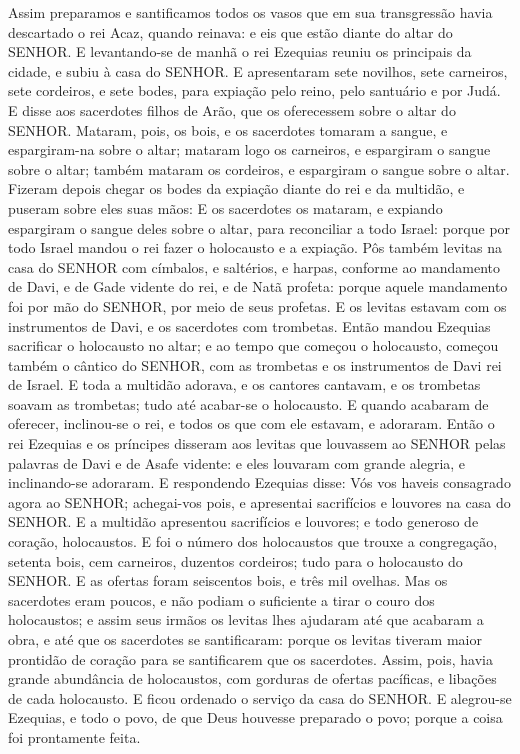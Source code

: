 {Assim preparamos e santificamos todos os vasos que em sua transgressão havia descartado o rei Acaz, quando reinava: e eis que estão diante do altar do SENHOR.
E levantando-se de manhã o rei Ezequias reuniu os principais da cidade, e subiu à casa do SENHOR.
E apresentaram sete novilhos, sete carneiros, sete cordeiros, e sete bodes, para expiação pelo reino, pelo santuário e por Judá. E disse aos sacerdotes filhos de Arão, que os oferecessem sobre o altar do SENHOR.
Mataram, pois, os bois, e os sacerdotes tomaram a sangue, e espargiram-na sobre o altar; mataram logo os carneiros, e espargiram o sangue sobre o altar; também mataram os cordeiros, e espargiram o sangue sobre o altar.
Fizeram depois chegar os bodes da expiação diante do rei e da multidão, e puseram sobre eles suas mãos:
E os sacerdotes os mataram, e expiando espargiram o sangue deles sobre o altar, para reconciliar a todo Israel: porque por todo Israel mandou o rei fazer o holocausto e a expiação.
Pôs também levitas na casa do SENHOR com címbalos, e saltérios, e harpas, conforme ao mandamento de Davi, e de Gade vidente do rei, e de Natã profeta: porque aquele mandamento foi por mão do SENHOR, por meio de seus profetas.
E os levitas estavam com os instrumentos de Davi, e os sacerdotes com trombetas.
Então mandou Ezequias sacrificar o holocausto no altar; e ao tempo que começou o holocausto, começou também o cântico do SENHOR, com as trombetas e os instrumentos de Davi rei de Israel.
E toda a multidão adorava, e os cantores cantavam, e os trombetas soavam as trombetas; tudo até acabar-se o holocausto.
E quando acabaram de oferecer, inclinou-se o rei, e todos os que com ele estavam, e adoraram.
Então o rei Ezequias e os príncipes disseram aos levitas que louvassem ao SENHOR pelas palavras de Davi e de Asafe vidente: e eles louvaram com grande alegria, e inclinando-se adoraram.
E respondendo Ezequias disse: Vós vos haveis consagrado agora ao SENHOR; achegai-vos pois, e apresentai sacrifícios e louvores na casa do SENHOR. E a multidão apresentou sacrifícios e louvores; e todo generoso de coração, holocaustos.
E foi o número dos holocaustos que trouxe a congregação, setenta bois, cem carneiros, duzentos cordeiros; tudo para o holocausto do SENHOR.
E as ofertas foram seiscentos bois, e três mil ovelhas.
Mas os sacerdotes eram poucos, e não podiam o suficiente a tirar o couro dos holocaustos; e assim seus irmãos os levitas lhes ajudaram até que acabaram a obra, e até que os sacerdotes se santificaram: porque os levitas tiveram maior prontidão de coração para se santificarem que os sacerdotes.
Assim, pois, havia grande abundância de holocaustos, com gorduras de ofertas pacíficas, e libações de cada holocausto. E ficou ordenado o serviço da casa do SENHOR.
E alegrou-se Ezequias, e todo o povo, de que Deus houvesse preparado o povo; porque a coisa foi prontamente feita.

}
